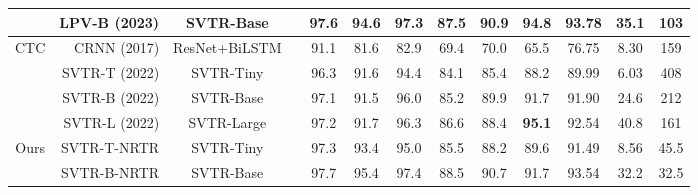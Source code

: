 \documentclass[10pt,journal,compsoc]{IEEEtran}
\begin{document}
\begin{table*}[t]
{\begin{tabular}{c|r|c|c|ccc|ccc|c|cc}
                        & LPV-B \cite{ijcai2023LPV} (2023) & SVTR-Base       &            & 97.6          & 94.6          & 97.3          & 87.5          & 90.9          & 94.8          & 93.78                                                                       &   35.1     & 103 \\
\hline
\multirow{4}{*}{CTC}    & CRNN \cite{shi2017crnn} (2017)& ResNet+BiLSTM     &            & 91.1          & 81.6          & 82.9          & 69.4          & 70.0          & 65.5          & 76.75                                                                       & 8.30                                                                     & 159                                                                  \\
                        & SVTR-T \cite{duijcai2022svtr} (2022)& SVTR-Tiny    &            & 96.3          & 91.6          & 94.4          & 84.1          & 85.4          & 88.2          & 89.99                                                                       & 6.03                                                                    & 408                                                               \\
                        & SVTR-B \cite{duijcai2022svtr} (2022) & SVTR-Base     &         & 97.1          & 91.5          & 96.0          & 85.2          & 89.9          & 91.7          & 91.90                                                                       & 24.6                                                                    & 212                                                               \\
                        & SVTR-L \cite{duijcai2022svtr} (2022)& SVTR-Large     &          & 97.2          & 91.7          & 96.3          & 86.6          & 88.4          & \textbf{95.1}          & 92.54                                                                       & 40.8                                                                    & 161                                                                \\
\hline
\multirow{5}{*}{Ours}    & SVTR-T-NRTR & SVTR-Tiny & \multirow{4}{*}{}    & 97.3          & 93.4          & 95.0          & 85.5          & 88.2          & 89.6          & 91.49                                                                       & 8.56                                                                     & 45.5                                                              \\
& SVTR-B-NRTR  & SVTR-Base  &      & 97.7 & 95.4 & 97.4 & 88.5 & 90.7 & 91.7 & 93.54                                                              & 32.2                                                                    & 32.5                                                               \\
                

\end{tabular}}
\end{table*}
\end{document}
